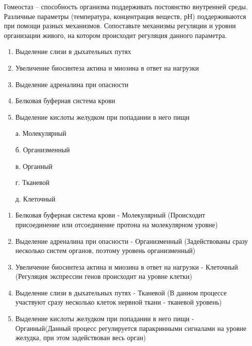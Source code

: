 
Гомеостаз – способность организма поддерживать постоянство
внутренней среды. Различные параметры (температура, концентрация веществ, рН)
поддерживаются при помощи разных механизмов. Сопоставьте механизмы регуляции и
уровни организации живого, на котором происходит регуляция данного параметра.

\begin{enumerate}
    \item Выделение слизи в дыхательных путях
    \item Увеличение биосинтеза актина и миозина в ответ на нагрузки
    \item Выделение адреналина при опасности
    \item Белковая буферная система крови
    \item Выделение кислоты желудком при попадании в него пищи
\end{enumerate}
    
\begin{enumerate}
    \item[а.] Молекулярный
    \item[б.] Организменный
    \item[в.] Органный
    \item[г.] Тканевой
    \item[д.] Клеточный
\end{enumerate}

\explanationSection

\begin{enumerate}
   \item Белковая буферная система крови - Молекулярный (Происходит присоединение или отсоединение протона на молекулярном уровне)
   \item Выделение адреналина при опасности - Организменный (Задействованы сразу несколько систем органов, поэтому уровень организменный)
   \item Увеличение биосинтеза актина и миозина в ответ на нагрузки - Клеточный (Регуляция экспрессии генов происходит на уровне клетки)  
   \item Выделение слизи в дыхательных путях - Тканевой (В данном процессе участвуют сразу несколько клеток нервной ткани - тканевой уровень)
   \item Выделение кислоты желудком при попадании в него пищи - Органный(Данный процесс регулируется паракринными сигналами на уровне желудка, при этом задействован весь орган)
\end{enumerate}

